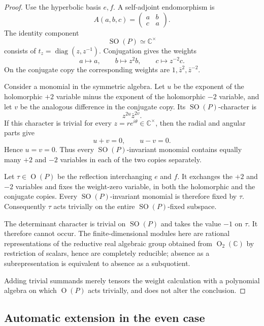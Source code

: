 \documentclass[10pt,a4paper]{amsart}
\numberwithin{equation}{section}
\newcommand{\C}{\mathbb C}
\newcommand{\SO}{\operatorname{SO}}
\newcommand{\Or}{\operatorname{O}}
\newcommand{\diag}{\operatorname{diag}}
\begin{document}
\begin{proof}
Use the hyperbolic basis $e,f$.  A self-adjoint endomorphism is
\[
  A(a,b,c)=
  \begin{pmatrix}a&b\\c&a\end{pmatrix}.
\]
The identity component
\[
  \SO(P)\simeq\C^\times
\]
consists of $t_z=\diag(z,z^{-1})$.  Conjugation gives the weights
\begin{equation}\label{spin:eq:ranktwo-weights}
  a\mapsto a,
  \qquad
  b\mapsto z^2b,
  \qquad
  c\mapsto z^{-2}c.
\end{equation}
On the conjugate copy the corresponding weights are
$1,\bar z^2,\bar z^{-2}$.

Consider a monomial in the symmetric algebra.  Let $u$ be the exponent of the
holomorphic $+2$ variable minus the exponent of the holomorphic $-2$ variable,
and let $v$ be the analogous difference in the conjugate copy.  Its
$\SO(P)$-character is
\[
  z^{2u}\bar z^{2v}.
\]
If this character is trivial for every $z=re^{i\theta}\in\C^\times$, then the
radial and angular parts give
\[
  u+v=0,
  \qquad
  u-v=0.
\]
Hence $u=v=0$.  Thus every $\SO(P)$-invariant monomial contains equally many
$+2$ and $-2$ variables in each of the two copies separately.

Let $\tau\in\Or(P)$ be the reflection interchanging $e$ and $f$.  It exchanges
the $+2$ and $-2$ variables and fixes the weight-zero variable, in both the
holomorphic and the conjugate copies.  Every $\SO(P)$-invariant monomial is
therefore fixed by $\tau$.  Consequently $\tau$ acts trivially on the entire
$\SO(P)$-fixed subspace.

The determinant character is trivial on $\SO(P)$ and takes the value $-1$ on
$\tau$.  It therefore cannot occur.  The finite-dimensional modules here are
rational representations of the reductive real algebraic group obtained from
$\Or_2(\C)$ by restriction of scalars, hence are completely reducible; absence
as a subrepresentation is equivalent to absence as a subquotient.

Adding trivial summands merely tensors the weight calculation with a polynomial
algebra on which $\Or(P)$ acts trivially, and does not alter the conclusion.
\end{proof}

\subsection{Automatic extension in the even case}\label{spin:sec:automatic}
\end{document}
